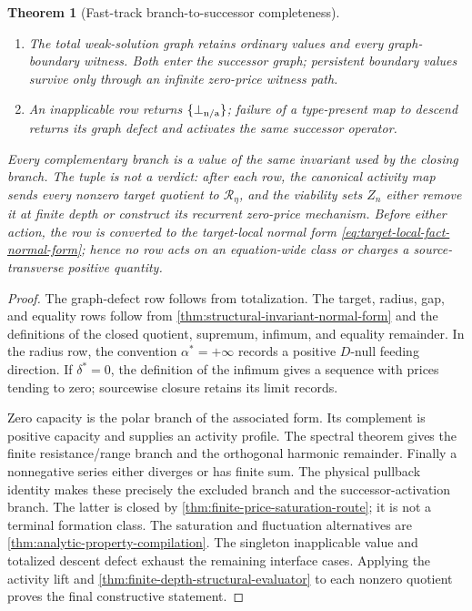 \documentclass[11pt]{article}
\numberwithin{section}{part}
\theoremstyle{plain}
\newtheorem{theorem}{Theorem}[section]
\theoremstyle{definition}
\theoremstyle{remark}
\begin{document}
\begin{theorem}[Fast-track branch-to-successor completeness]
\begin{enumerate}[label=\textup{(F\arabic*)}]
covariance/bracket class in the existing lifted source cell.
\item The total weak-solution graph retains ordinary values and every
graph-boundary witness.  Both enter the successor graph; persistent boundary
values survive only through an infinite zero-price witness path.
\item An inapplicable row returns \(\{\bot_{\rm n/a}\}\); failure of a
type-present map to descend returns its graph defect and activates the same
successor operator.
\end{enumerate}
Every complementary branch is a value of the same invariant used by the
closing branch.  The tuple is not a verdict: after each row, the canonical
activity map sends every nonzero target quotient to
\(\mathcal R_\eta\), and the viability sets \(Z_n\) either remove it at finite
depth or construct its recurrent zero-price mechanism.  Before either action,
the row is converted to the target-local normal form
\eqref{eq:target-local-fact-normal-form}; hence no row acts on an
equation-wide class or charges a source-transverse positive quantity.
\end{theorem}

\begin{proof}
The graph-defect row follows from totalization.  The target, radius, gap, and
equality rows follow from
\cref{thm:structural-invariant-normal-form} and the definitions of the
closed quotient, supremum, infimum, and equality remainder.  In
the radius row, the convention \(\alpha^*=+\infty\) records a positive
\(D\)-null feeding direction.  If \(\delta^*=0\), the definition of the
infimum gives a sequence with prices tending to zero; sourcewise closure
retains its limit records.

Zero capacity is the polar branch of the associated form.  Its complement is
positive capacity and supplies an activity profile.  The spectral theorem gives the finite
resistance/range branch and the orthogonal harmonic remainder.  Finally a
nonnegative series either diverges or has finite sum.  The physical pullback
identity makes these precisely the excluded branch and the
successor-activation branch.  The latter is closed by
\cref{thm:finite-price-saturation-route}; it is not a terminal formation
class.  The saturation and fluctuation alternatives are
\cref{thm:analytic-property-compilation}.  The singleton inapplicable value
and totalized descent defect exhaust the remaining interface cases.  Applying
the activity lift and \cref{thm:finite-depth-structural-evaluator} to
each nonzero quotient proves the final constructive statement.
\end{proof}
\end{document}
